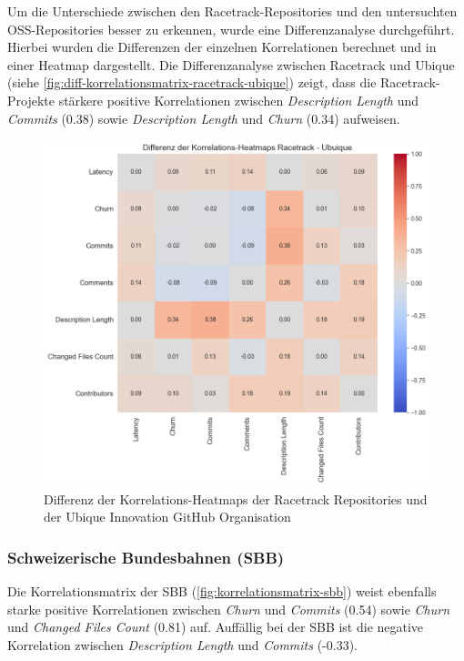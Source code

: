 \newpage
Um die Unterschiede zwischen den Racetrack-Repositories und den untersuchten OSS-Repositories besser zu erkennen, wurde eine Differenzanalyse durchgeführt. Hierbei wurden die Differenzen der einzelnen Korrelationen berechnet und in einer Heatmap dargestellt. Die Differenzanalyse zwischen Racetrack und Ubique (siehe \autoref{fig:diff-korrelationsmatrix-racetrack-ubique}) zeigt, dass die Racetrack-Projekte stärkere positive Korrelationen zwischen \textit{Description Length} und \textit{Commits} (0.38) sowie \textit{Description Length} und \textit{Churn} (0.34) aufweisen.

\begin{figure}[htbp]
\includegraphics[width=\textwidth]{Figures/diff-korrelationsmatrix-racetrack-ubique.png}
\caption{Differenz der Korrelations-Heatmaps der Racetrack Repositories und der Ubique Innovation GitHub Organisation}
\label{fig:diff-korrelationsmatrix-racetrack-ubique}
\end{figure}

\newpage
\subsubsection{Schweizerische Bundesbahnen (SBB)}
Die Korrelationsmatrix der SBB (\autoref{fig:korrelationsmatrix-sbb}) weist ebenfalls starke positive Korrelationen zwischen \textit{Churn} und \textit{Commits} (0.54) sowie \textit{Churn} und \textit{Changed Files Count} (0.81) auf. Auffällig bei der SBB ist die negative Korrelation zwischen \textit{Description Length} und \textit{Commits} (-0.33).

